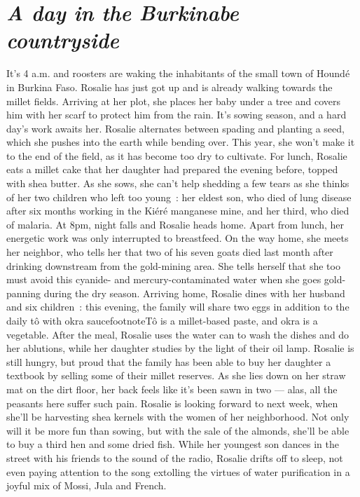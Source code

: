 \documentclass[a5paper,french,openany]{memoir}
\begin{document}
\chapter*{\textit{A day in the Burkinabe countryside}}\label{ch:narr_burkina}

It's 4 a.m. and roosters are waking the inhabitants of the small town of Houndé in Burkina Faso. Rosalie has just got up and is already walking towards the millet fields. Arriving at her plot, she places her baby under a tree and covers him with her scarf to protect him from the rain. It's sowing season, and a hard day's work awaits her. Rosalie alternates between spading and planting a seed, which she pushes into the earth while bending over. This year, she won't make it to the end of the field, as it has become too dry to cultivate. For lunch, Rosalie eats a millet cake that her daughter had prepared the evening before, topped with shea butter. As she sows, she can't help shedding a few tears as she thinks of her two children who left too young~: her eldest son, who died of lung disease after six months working in the Kiéré manganese mine, and her third, who died of malaria. At 8pm, night falls and Rosalie heads home. Apart from lunch, her energetic work was only interrupted to breastfeed. On the way home, she meets her neighbor, who tells her that two of his seven goats died last month after drinking downstream from the gold-mining area. She tells herself that she too must avoid this cyanide- and mercury-contaminated water when she goes gold-panning during the dry season. Arriving home, Rosalie dines with her husband and six children~: this evening, the family will share %
two eggs in addition to the daily tô with okra saucefootnote{Tô is a millet-based paste, and okra is a vegetable}. %
After the meal, Rosalie uses the water can to wash the dishes and do her ablutions, while her daughter studies by the light of their oil lamp. Rosalie is still hungry, but proud that the family has been able to buy her daughter a textbook by selling some of their millet reserves. As she lies down on her straw mat on the dirt floor, her back feels like it's been sawn in two --- alas, all the peasants here suffer such pain. Rosalie is looking forward to next week, when she'll be harvesting shea kernels with the women of her neighborhood. Not only will it be more fun than sowing, but with the sale of the almonds, she'll be able to buy a third hen and some dried fish. While her youngest son dances in the street with his friends to the sound of the radio, Rosalie drifts off to sleep, not even paying attention to the song extolling the virtues of water purification in a joyful mix of Mossi, Jula and French. 
\end{document}

